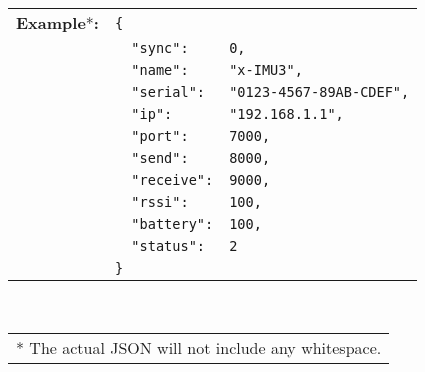 \begin{table}[H]
    \begin{tabular}{l l l}
        \textbf{Example}*\textbf{:} & \texttt{\{}\\
        & \texttt{~~"sync":} & \texttt{0,}\\
        & \texttt{~~"name":} & \texttt{"x-IMU3",}\\
        & \texttt{~~"serial":} & \texttt{"0123-4567-89AB-CDEF",}\\
        & \texttt{~~"ip":} & \texttt{"192.168.1.1",}\\
        & \texttt{~~"port":} & \texttt{7000,}\\
        & \texttt{~~"send":} & \texttt{8000,}\\
        & \texttt{~~"receive":} & \texttt{9000,}\\
        & \texttt{~~"rssi":} & \texttt{100,}\\
        & \texttt{~~"battery":} & \texttt{100,}\\
        & \texttt{~~"status":} & \texttt{2}\\
        & \texttt{\}}
    \end{tabular}\\
    \begin{tabular}{l}
        \\
        \footnotesize{* The actual \acs{JSON} will not include any whitespace.}
    \end{tabular}
\end{table}
